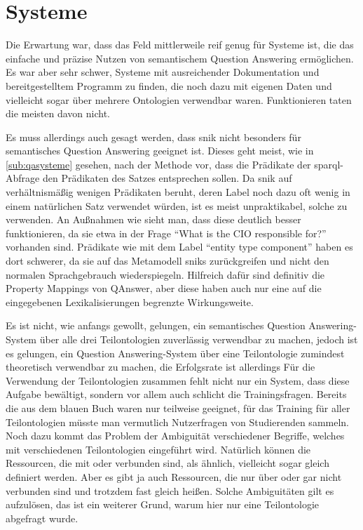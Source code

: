 \section{Systeme}

Die Erwartung war, dass das Feld mittlerweile reif genug für Systeme ist, die das einfache und präzise Nutzen von semantischem Question Answering ermöglichen.
Es war aber sehr schwer, Systeme mit ausreichender Dokumentation und bereitgestelltem Programm zu finden, die noch dazu mit eigenen Daten und vielleicht sogar über mehrere Ontologien verwendbar waren.
Funktionieren taten die meisten davon nicht.

Es muss allerdings auch gesagt werden, dass \ac{snik} nicht besonders für semantisches Question Answering geeignet ist.
Dieses geht meist, wie in \cref{sub:qasysteme} gesehen, nach der Methode vor, dass die Prädikate der \ac{sparql}-Abfrage den Prädikaten des Satzes entsprechen sollen.
Da \ac{snik} auf verhältnismäßig wenigen Prädikaten beruht, deren Label noch dazu oft wenig in einem natürlichen Satz verwendet würden, ist es meist unpraktikabel, solche zu verwenden.
An Außnahmen wie  sieht man, dass diese deutlich besser funktionieren, da sie etwa in der Frage \enquote{What is the CIO responsible for?} vorhanden sind.
Prädikate wie  mit dem Label \enquote{entity type component} haben es dort schwerer, da sie auf das Metamodell \ac{snik}s zurückgreifen
und nicht den normalen Sprachgebrauch wiederspiegeln.
Hilfreich dafür sind definitiv die Property Mappings von QAnswer, aber diese haben auch nur eine auf die eingegebenen Lexikalisierungen begrenzte Wirkungsweite.

Es ist nicht, wie anfangs gewollt, gelungen, ein semantisches Question Answering-System über alle drei Teilontologien zuverlässig verwendbar zu machen,
jedoch ist es gelungen, ein Question Answering-System über eine Teilontologie zumindest theoretisch verwendbar zu machen, die Erfolgsrate ist allerdings 
Für die Verwendung der Teilontologien zusammen fehlt nicht nur ein System, dass diese Aufgabe bewältigt, sondern vor allem auch schlicht die Trainingsfragen.
Bereits die aus dem blauen Buch waren nur teilweise geeignet, für das Training für aller Teilontologien müsste man vermutlich Nutzerfragen von Studierenden sammeln.
Noch dazu kommt das Problem der Ambiguität verschiedener Begriffe, welches mit verschiedenen Teilontologien eingeführt wird.
Natürlich können die Ressourcen, die mit  oder  verbunden sind, als ähnlich, vielleicht sogar gleich definiert werden.
Aber es gibt ja auch Ressourcen, die nur über  oder gar nicht verbunden sind und trotzdem fast gleich heißen.
Solche Ambiguitäten gilt es aufzulösen, das ist ein weiterer Grund, warum hier nur eine Teilontologie abgefragt wurde.
